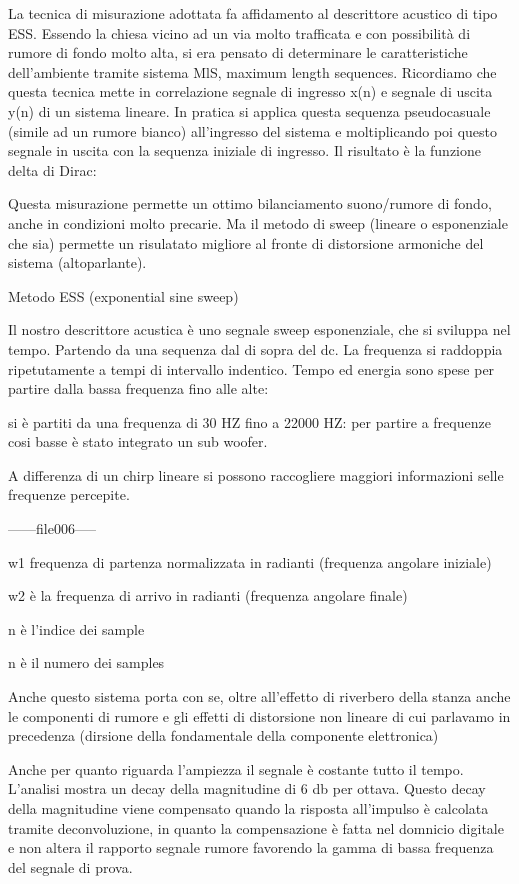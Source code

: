 La tecnica di misurazione adottata fa affidamento al descrittore acustico di tipo ESS.
Essendo la chiesa vicino ad un via molto trafficata e con possibilità di rumore di fondo molto alta, si era pensato di determinare le caratteristiche dell'ambiente tramite sistema MlS, maximum length sequences. 
Ricordiamo che questa tecnica mette in correlazione segnale di ingresso x(n) e segnale di uscita y(n) di un sistema lineare. 
In pratica si applica questa sequenza pseudocasuale (simile ad un rumore bianco) all'ingresso del sistema e moltiplicando poi questo segnale in uscita con la sequenza iniziale di ingresso. Il risultato è la funzione delta di Dirac:

Questa misurazione permette un ottimo bilanciamento suono/rumore di fondo, anche in condizioni molto precarie.
Ma il metodo  di sweep (lineare o esponenziale che sia) permette un risulatato migliore al fronte di distorsione armoniche del sistema (altoparlante).

Metodo ESS (exponential sine sweep)

Il nostro descrittore acustica è uno segnale sweep esponenziale, che si sviluppa nel tempo.
Partendo da una sequenza dal di sopra del dc. 
La frequenza si raddoppia ripetutamente a tempi di intervallo indentico. Tempo ed energia sono spese per partire dalla bassa frequenza fino alle alte:

si è partiti da una frequenza di 30 HZ fino a 22000 HZ:
per partire a frequenze cosi basse è stato integrato un sub woofer.

A differenza di un chirp lineare si possono raccogliere maggiori informazioni selle frequenze percepite. 

------file006-----

w1 frequenza di partenza normalizzata in radianti (frequenza angolare iniziale)

w2 è la frequenza di arrivo in radianti (frequenza angolare finale)

n è l'indice dei sample

n è il numero dei samples

Anche questo sistema porta con se, oltre all'effetto di riverbero della stanza anche le componenti di rumore e gli effetti di distorsione non lineare di cui parlavamo in precedenza (dirsione della fondamentale della componente elettronica)

Anche per quanto riguarda l'ampiezza il segnale è costante tutto il tempo. L'analisi mostra un decay della magnitudine di 6 db per ottava. Questo decay della magnitudine viene compensato quando la risposta all'impulso è calcolata tramite deconvoluzione, in quanto la compensazione è fatta nel domnicio digitale e non altera il rapporto segnale rumore favorendo la gamma di bassa frequenza del segnale di prova.

